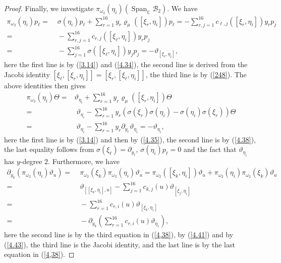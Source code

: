 \documentclass[12pt]{article}
\numberwithin{equation}{section}
\theoremstyle{definition}
\theoremstyle{remark}
\begin{document}
\begin{proof}
	Finally, we investigate $\pi_{\omega_2}(\eta_i)(\operatorname{Span}_{\mathbb{C}}\mathcal{B}_2)$. We have
	\begin{align}
		\pi_{\omega_2}(\eta_i)p_{\ell}=&\;\sigma(\eta_i)p_{\ell}+\sum_{r=1}^{16}y_r\varrho_{\mu}([\xi_r,\eta_i])p_\ell=-\sum_{r,j=1}^{16}c_{\ell,j}([\xi_r,\eta_i])y_rp_j\nonumber\\
		=&\;-\sum_{r,j=1}^{16}c_{r,j}([\xi_\ell,\eta_i])y_rp_{j}\nonumber\\
		=&\;-\sum_{j=1}^{16}\sigma([\xi_\ell,\eta_i])y_jp_j=-\vartheta_{[\xi_\ell,\eta_i]}, \label{4.43}
	\end{align}
	here the first line is by (\ref{3.14}) and (\ref{4.34}), the second line is derived from the Jacobi identity $[\xi_\ell,[\xi_r,\eta_i]]=[\xi_r,[\xi_\ell,\eta_i]]$, the third line is by (\ref{248}). The above identities then gives
    \begin{align}
    	\pi_{\omega_2}(\eta_i)\Theta=&\vartheta_{\eta_i}+\sum_{r=1}^{16}y_r\varrho_{\mu}([\xi_r,\eta_i])\Theta\nonumber\\
    	=&\;\vartheta_{\eta_i}-\sum_{r=1}^{16}y_r(\sigma(\xi_r)\sigma(\eta_i)-\sigma(\eta_i)\sigma(\xi_{r}))\Theta\nonumber\\
    	=&\;\vartheta_{\eta_i}-\sum_{r=1}^{16}y_{r}\partial_{y_{r}}\vartheta_{\eta_i}=-\vartheta_{\eta_i}, \label{4.44}
    \end{align}
    here the first line is by (\ref{3.14}) and then by (\ref{4.35}), the second line is by (\ref{4.38}), the last equality follows from $\sigma(\xi_\ell)=\partial_{y_{\ell}}$, $\sigma(\eta_i)p_\ell=0$ and the fact that $\vartheta_{\eta_i}$ has $y$-degree $2$. Furthermore, we have
    \begin{align}
    	\partial_{y_k}(\pi_{\omega_2}(\eta_i)\vartheta_u)=&\;\pi_{\omega_2}(\xi_k)\pi_{\omega_2}(\eta_i)\vartheta_u=\pi_{\omega_2}([\xi_k,\eta_i])\vartheta_u+\pi_{\omega_2}(\eta_i)\pi_{\omega_2}(\xi_k)\vartheta_u\nonumber\\
    	=&\;\vartheta_{[[\xi_k,\eta_i],u]}-\sum_{j=1}^{16}c_{k,j}(u)\vartheta_{[\xi_j,\eta_i]}\nonumber\\
    	=&\;-\sum_{r=1}^{16}c_{r,i}(u)\vartheta_{[\xi_k,\eta_r]}\nonumber\\
    	=&\;-\partial_{y_k}(\sum_{r=1}^{16}c_{r,i}(u)\vartheta_{\eta_r}),
    \end{align}
    here the second line is by the third equation in (\ref{4,38}), by (\ref{4.41}) and by (\ref{4.43}), the third line is the Jacobi identity, and the last line is by the last equation in (\ref{4,38}).

\end{proof}
\end{document}
